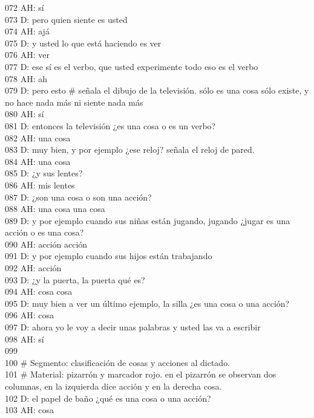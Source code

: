 072 AH: sí\\
073 D: pero quien siente es usted\\
074 AH: ajá\\
075 D: y usted lo que está haciendo es ver\\
076 AH: ver\\
077 D: ese sí es el verbo, que usted experimente todo eso es el verbo\\
078 AH: ah\\
079 D: pero esto \# señala el dibujo de la televisión. sólo es una cosa sólo existe, y no hace nada más ni siente nada más\\
080 AH: sí\\
081 D: entonces la televisión ¿es una cosa o es un verbo?\\
082 AH: una cosa\\
083 D: muy bien, y por ejemplo ¿ese reloj?  señala el reloj de pared.\\
084 AH: una cosa\\
085 D: ¿y sus lentes?\\
086 AH: mis lentes\\
087 D: ¿son una cosa o son una acción?\\
088 AH: una cosa una cosa\\
089 D: y por ejemplo cuando sus niñas están jugando, jugando ¿jugar es una acción o es una cosa?\\
090 AH: acción acción\\
091 D: y por ejemplo cuando sus hijos están trabajando\\
092 AH: acción\\
093 D: ¿y la puerta, la puerta qué es?\\
094 AH: cosa cosa\\
095 D: muy bien a ver un último ejemplo, la silla ¿es una cosa o una acción?\\
096 AH: cosa\\
097 D: ahora yo le voy a decir unas palabras y usted las va a escribir\\
098 AH: sí\\
099 \\
100 \# Segmento: clasificación de cosas y acciones al dictado.\\
101 \# Material: pizarrón y marcador rojo. en el pizarrón se observan dos columnas, en la izquierda dice acción y en la derecha cosa.\\
102 D: el papel de baño ¿qué es una cosa o una acción?\\
103 AH: cosa\\
